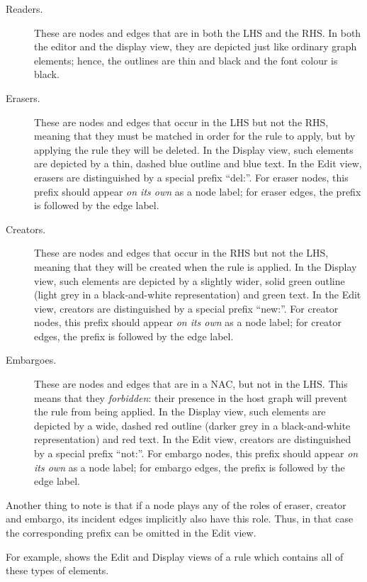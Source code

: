 \begin{description}
\item[Readers.] These are nodes and edges that are in both the LHS and the RHS.
  In both the editor and the display view, they are depicted just like ordinary
  graph elements; hence, the outlines are thin and black and the font colour is
  black.

\item[Erasers.] These are nodes and edges that occur in the LHS but not the
  RHS, meaning that they must be matched in order for the rule to apply, but by
  applying the rule they will be deleted. In the Display view, such elements
  are depicted by a thin, dashed blue outline and blue text. In the Edit view,
  erasers are distinguished by a special prefix ``\textsf{del:}''. For eraser
  nodes, this prefix should appear \emph{on its own} as a node label; for
  eraser edges, the prefix is followed by the edge label.

\item[Creators.] These are nodes and edges that occur in the RHS but not the
  LHS, meaning that they will be created when the rule is applied. In the
  Display view, such elements are depicted by a slightly wider, solid green
  outline (light grey in a black-and-white representation) and green text. In
  the Edit view, creators are distinguished by a special prefix
  ``\textsf{new:}''. For creator nodes, this prefix should appear \emph{on its
  own} as a node label; for creator edges, the prefix is followed by the edge
  label.

\item[Embargoes.] These are nodes and edges that are in a NAC, but not in the
  LHS. This means that they \emph{forbidden}: their presence in the host graph
  will prevent the rule from being applied. In the Display view, such elements
  are depicted by a wide, dashed red outline (darker grey in a black-and-white
  representation) and red text. In the Edit view, creators are distinguished by
  a special prefix ``\textsf{not:}''. For embargo nodes, this prefix should
  appear \emph{on its own} as a node label; for embargo edges, the prefix is
  followed by the edge label.
\end{description}
%
Another thing to note is that if a node plays any of the roles of eraser,
creator and embargo, its incident edges implicitly also have this role. Thus,
in that case the corresponding prefix can be omitted in the Edit view.

For example,  shows the Edit and Display views of a rule
which contains all of these types of elements.

